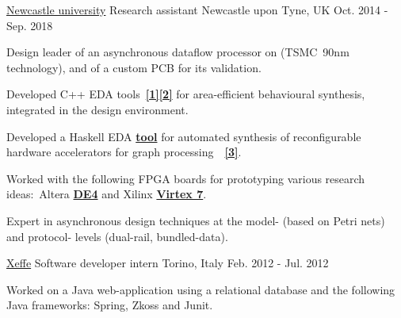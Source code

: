 
\begin{cventries}

\cventry
{\href{https://www.ncl.ac.uk/}{\color{myblue}Newcastle university}}
{Research assistant} %
{Newcastle upon Tyne, UK} %
{Oct. 2014 - Sep. 2018} %
{ 
\begin{cvitems}
\item {Design leader of an asynchronous dataflow processor on
\href{https://ieeexplore.ieee.org/document/8342264/}{}
(TSMC~90nm technology), and of a custom PCB for its validation.}
\item {Developed C++ EDA
tools~{\color{myblue}\href{https://github.com/tuura/shutters}{\textbf{[1]}}}{\color{myblue}\href{https://github.com/tuura/scenco}{\textbf{[2]}}}
for area-efficient behavioural synthesis, integrated in the
\href{https://workcraft.org/}{}
design environment.}
\item {Developed a Haskell EDA 
{\color{myblue}\href{https://github.com/tuura/fantasi/tree/master/doc}{\textbf{tool}}}
for automated synthesis of reconfigurable hardware accelerators for graph
processing~~{\color{myblue}\href{https://poets-project.org/publications}{\textbf{[3]}}}.}
\item {Worked with the following FPGA boards for prototyping various research 
ideas:~Altera 	
{\color{myblue}\href{https://www.altera.com/solutions/partners/partner-profile/terasic-inc-/board/de4-stratix-iv-development-board.html\#overview}{\textbf{DE4}}}
and Xilinx 	
{\color{myblue}\href{https://www.xilinx.com/products/boards-and-kits/ek-v7-vc707-g.html}{\textbf{Virtex
 7}}}.}
\item {Expert in asynchronous design techniques at the model- (based on 
Petri nets) and protocol- levels (dual-rail, bundled-data).}
\end{cvitems}
}


\cventry
{\color{myblue}\href{http://www.xeffe.it/}{Xeffe}}
{Software developer intern}
{Torino, Italy}
{Feb. 2012 - Jul. 2012}
{
\begin{cvitems}
Worked on a Java web-application using a relational database and 
the following Java frameworks: Spring, Zkoss and Junit.
\end{cvitems}
}


\end{cventries}
\vspace{-1mm}